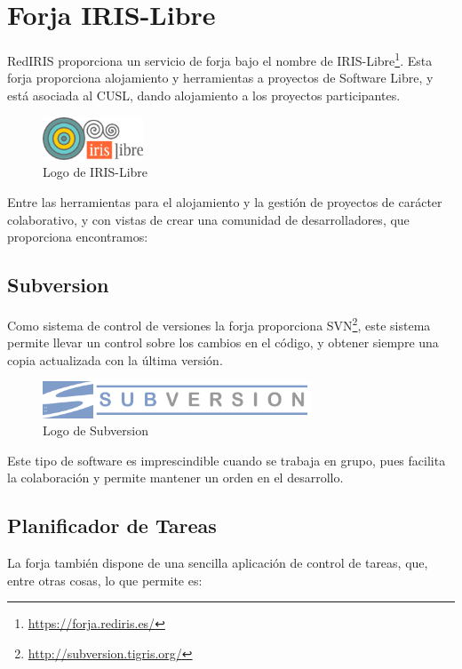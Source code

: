 \section*{Forja IRIS-Libre}

RedIRIS proporciona un servicio de forja bajo el nombre de
IRIS-Libre\footnote{\url{https://forja.rediris.es/}}. Esta forja proporciona
alojamiento y herramientas a proyectos de Software Libre, y está asociada al
CUSL, dando alojamiento a los proyectos participantes.

\begin{figure}[H]
 \centering
 \includegraphics[width=30mm]{figuras/cap5/iris_libre.png}
 \caption{Logo de IRIS-Libre}
\end{figure}

Entre las herramientas para el alojamiento y la gestión de proyectos de carácter
colaborativo, y con vistas de crear una comunidad de desarrolladores, que
proporciona encontramos:

\subsection*{Subversion}

Como sistema de control de versiones la forja proporciona
SVN\footnote{\url{http://subversion.tigris.org/}}, este sistema permite llevar
un control sobre los cambios en el código, y obtener siempre una copia
actualizada con la última versión.

\begin{figure}[H]
 \centering
 \includegraphics[width=80mm]{figuras/cap5/svn.png}
 \caption{Logo de Subversion}
\end{figure}

Este tipo de software es imprescindible cuando se trabaja en grupo, pues
facilita la colaboración y permite mantener un orden en el desarrollo.

\subsection*{Planificador de Tareas}

La forja también dispone de una sencilla aplicación de control de tareas, que,
entre otras cosas, lo que permite es:

